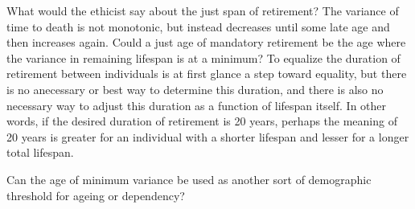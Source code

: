 \documentclass{article}
\begin{document}
What would the ethicist say about the just span of retirement? The variance of
time to death is not monotonic, but instead decreases until some late age and
then increases again. Could a just age of mandatory retirement be the age where
the variance in remaining lifespan is at a minimum? To equalize the duration of
retirement between individuals is at first glance a step toward equality, but
there is no anecessary or best way to determine this duration, and there is also
no necessary way to adjust this duration as a function of lifespan itself. In
other words, if the desired duration of retirement is 20 years, perhaps the
meaning of 20 years is greater for an individual with a shorter lifespan and
lesser for a longer total lifespan.

Can the age of minimum variance be used as another sort of demographic threshold
for ageing or dependency?
\end{document}
